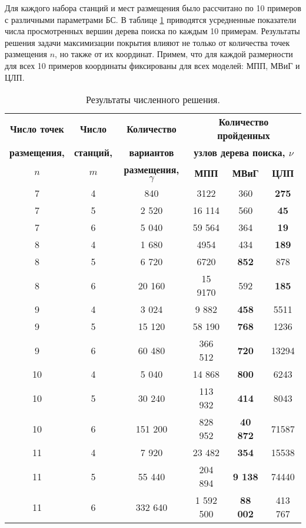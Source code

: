 Для каждого набора станций и мест размещения было рассчитано по 10 примеров с различными параметрами БС. В таблице \cref{tab:models_comparation} приводятся усредненные показатели числа просмотренных вершин дерева поиска по каждым 10 примерам. Результаты решения задачи максимизации покрытия влияют не только от количества точек размещения $n$, но также от их координат. Примем, что для каждой размерности для всех 10 примеров координаты фиксированы для всех моделей: МПП, МВиГ и ЦЛП. 


\begin{table}
  \caption{Результаты численного решения.}\label{tab:models_comparation}
  \begin{tabular}{|ccc|*{3}{c}|} \cline{3-6}
  \hline
  \textbf{Число точек} & \textbf{Число} &\textbf{Количество} & \multicolumn{3}{c|}{\textbf{Количество пройденных}}\\ 
  \textbf{размещения,} & \textbf{станций,} & \textbf{вариантов} & \multicolumn{3}{c|}{\textbf{узлов дерева поиска, $\nu$}}\\
  \cline{4-6}
  \textbf{$n$} & \textbf{$m$} &\textbf{размещения, $\gamma$} & \textbf{МПП}& \textbf{МВиГ} & \textbf{ЦЛП} \\ 
  \hline
  7 &  4 & 840 & 3122 & 360 &  \textbf{275} \\
  7 &  5 & 2 520 & 16 114 & 560  &  \textbf{45}  \\
  7 &  6 & 5 040 & 59 564 & 364  &  \textbf{19}  \\
  8 &  4 & 1 680 &  4954 &  434 &   \textbf{189} \\
  8 &  5 & 6 720 & 6720 & \textbf{852}  &  878 \\
  8 &  6 & 20 160 &  15 9170 & 592  & \textbf{185}  \\
  9  &  4 & 3 024 & 9 882 & \textbf{458} & 5511 \\
  9  &  5 & 15 120&  58 190 &  \textbf{768} &  1236\\
  9  &  6 & 60 480&  366 512 &  \textbf{720} & 13294 \\
  10 &  4 & 5 040&  14 868&  \textbf{800}&  6243\\
  10 &	5 & 30 240&  113 932&  \textbf{414}&  8043\\
  10 &	6 & 151 200&  828 952&  \textbf{40 872}&  71587\\
  11 &  4 & 7 920& 23 482&  \textbf{354} & 15538\\
  11 &	5 & 55 440& 204 894& \textbf{9 138}&  74440\\
  11 &	6 & 332 640& 1 592 500 & \textbf{88 002} & 413 767 \\
  \hline
  \end{tabular}
\end{table} 
\normalsize

